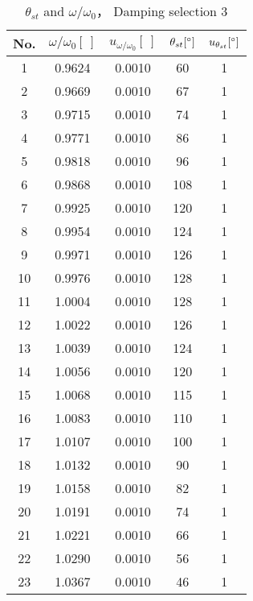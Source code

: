         \begin{table}[H]
        \centering
            \begin{tabular}{|c|c|c|c|c|}
                \hline
                No. & $\omega/\omega_0[\ ]$ & $u_{\omega/\omega_0}[\ ]$ & $\theta_{st}[^\circ]$ & $u_{\theta_{st}}[^\circ]$\\\hline
                1 & 0.9624 & 0.0010 & 60 & 1\\\hline
                2 & 0.9669 & 0.0010 & 67 & 1\\\hline
                3 & 0.9715 & 0.0010 & 74 & 1\\\hline
                4 & 0.9771 & 0.0010 & 86 & 1\\\hline
                5 & 0.9818 & 0.0010 & 96 & 1\\\hline
                6 & 0.9868 & 0.0010 & 108 & 1\\\hline
                7 & 0.9925 & 0.0010 & 120 & 1\\\hline
                8 & 0.9954 & 0.0010 & 124 & 1\\\hline
                9 & 0.9971 & 0.0010 & 126 & 1\\\hline
                10 & 0.9976 & 0.0010 & 128 & 1\\\hline
                11 & 1.0004 & 0.0010 & 128 & 1\\\hline
                12 & 1.0022 & 0.0010 & 126 & 1\\\hline
                13 & 1.0039 & 0.0010 & 124 & 1\\\hline
                14 & 1.0056 & 0.0010 & 120 & 1\\\hline
                15 & 1.0068 & 0.0010 & 115 & 1\\\hline
                16 & 1.0083 & 0.0010 & 110 & 1\\\hline
                17 & 1.0107 & 0.0010 & 100 & 1\\\hline
                18 & 1.0132 & 0.0010 & 90 & 1\\\hline
                19 & 1.0158 & 0.0010 & 82 & 1\\\hline
                20 & 1.0191 & 0.0010 & 74 & 1\\\hline
                21 & 1.0221 & 0.0010 & 66 & 1\\\hline
                22 & 1.0290 & 0.0010 & 56 & 1\\\hline
                23 & 1.0367 & 0.0010 & 46 & 1\\\hline
            \end{tabular}
            \caption{$\theta_{st}$ and $\omega/\omega_0$， Damping selection 3}\label{data_theta3}
        \end{table}
